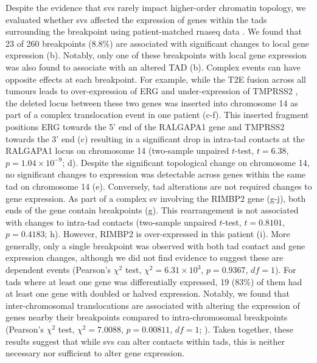 Despite the evidence that \glspl{sv} rarely impact higher-order chromatin topology, we evaluated whether \glspl{sv} affected the expression of genes within the \glspl{tad} surrounding the breakpoint using patient-matched \gls{rnaseq} data \cite{chenWidespreadFunctionalRNA2019}.
We found that 23 of 260 breakpoints (8.8\%) are associated with significant changes to local gene expression (b).
Notably, only one of these breakpoints with local gene expression was also found to associate with an altered TAD (b).
Complex events can have opposite effects at each breakpoint.
For example, while the T2E fusion across all tumours leads to over-expression of ERG and under-expression of TMPRSS2 \cite{fraserGenomicHallmarksLocalized2017,kronTMPRSS2ERGFusion2017}, the deleted locus between these two genes was inserted into chromosome 14 as part of a complex translocation event in one patient (c-f).
This inserted fragment positions ERG towards the 5' end of the RALGAPA1 gene and TMPRSS2 towards the 3' end (c) resulting in a significant drop in intra-\gls{tad} contacts at the RALGAPA1 locus on chromosome 14 (two-sample unpaired $t$-test, $t = 6.38$, $p = 1.04 \times 10^{-9}$; d).
Despite the significant topological change on chromosome 14, no significant changes to expression was detectable across genes within the same \gls{tad} on chromosome 14 (e).
Conversely, \gls{tad} alterations are not required changes to gene expression.
As part of a complex \gls{sv} involving the RIMBP2 gene (g-j), both ends of the gene contain breakpoints (g).
This rearrangement is not associated with changes to intra-\gls{tad} contacts (two-sample unpaired $t$-test, $t = 0.8101$, $p = 0.4183$; h).
However, RIMBP2 is over-expressed in this patient (i).
More generally, only a single breakpoint was observed with both \gls{tad} contact and gene expression changes, although we did not find evidence to suggest these are dependent events (Pearson's $\chi^2$ test, $\chi^2 = 6.31 \times 10^3$, $p = 0.9367$, $df = 1$).
For \glspl{tad} where at least one gene was differentially expressed, 19 (83\%) of them had at least one gene with doubled or halved expression.
Notably, we found that inter-chromosomal translocations are associated with altering the expression of genes nearby their breakpoints compared to intra-chromosomal breakpoints (Pearson's $\chi^2$ test, $\chi^2 = 7.0088$, $p = 0.00811$, $df = 1$; ).
Taken together, these results suggest that while \glspl{sv} can alter contacts within \glspl{tad}, this is neither necessary nor sufficient to alter gene expression.

